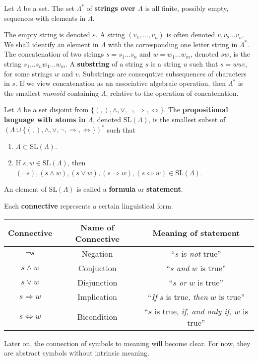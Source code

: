 \begin{definition}
    Let $\Lambda$ be a set. The set $\Lambda^*$ of {\bf strings over $\Lambda$} is all finite, possibly empty, sequences with elements in $\Lambda$.
\end{definition}

The empty string is denoted $\varepsilon$. A string $(v_1, \dots, v_n)$ is often denoted $v_1 v_2 \dots v_n$. We shall identify an element in $\Lambda$ with the corresponding one letter string in $\Lambda^*$. The concatenation of two strings $s = s_1 \dots s_n$ and $w = w_1 \dots w_m$, denoted $sw$, is the string $s_1 \dots s_n w_1 \dots w_m$. A {\bf substring} of a string $s$ is a string $u$ such that $s = wuv$, for some strings $w$ and $v$. Substrings are consequtive subsequences of characters in $s$. If we view concatenation as an associative algebraic operation, then $\Lambda^*$ is the smallest {\it monoid} containing $\Lambda$, relative to the operation of concatenation.

\begin{definition}
    Let $\Lambda$ be a set disjoint from $\{ (, ), \wedge, \vee, \neg, \Rightarrow, \Leftrightarrow \}$. The {\bf propositional language with atoms in $\Lambda$}, denoted $\text{SL}(\Lambda)$, is the smallest subset of $(\Lambda \cup \{ (, ), \wedge, \vee, \neg, \Rightarrow, \Leftrightarrow \})^*$ such that
    \begin{enumerate}
        \item $\Lambda \subset \text{SL}(\Lambda)$.
        \item If $s, w \in \text{SL}(\Lambda)$, then $(\neg s), (s \wedge w), (s \vee w), (s \Rightarrow w), (s \Leftrightarrow w) \in \text{SL}(\Lambda)$.
    \end{enumerate}
    An element of $\text{SL}(\Lambda)$ is called a {\bf formula} or {\bf statement}.
\end{definition}

Each {\bf connective} represents a certain linguistical form.
%
\begin{center}
\begin{tabular}{| c | c | c |}
    \hline Connective & Name of Connective & Meaning of statement \\
    \hline $\neg s$ & Negation & ``$s$ is {\it not} true''\\
    $s \wedge w$ & Conjuction & ``$s$ {\it and} $w$ is true''\\
    $s \vee w$ & Disjunction & ``$s$ {\it or} $w$ is true''\\
    $s \Rightarrow w$ & Implication & ``{\it If} $s$ is true, {\it then} $w$ is true''\\
    $s \Leftrightarrow w$ & Bicondition & ``$s$ is true, {\it if, and only if,} $w$ is true''\\
    \hline
\end{tabular}
\end{center}
%
Later on, the connection of symbols to meaning will become clear. For now, they are abstract symbols without intrinsic meaning.

